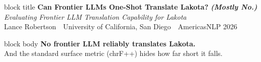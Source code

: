 \documentclass[final]{beamer}
\begin{document}
\begin{frame}[t]

\begin{beamercolorbox}[wd=\paperwidth,sep=22pt]{block title}
\centering
{\headfont\bfseries\fontsize{74}{86}\selectfont Can Frontier LLMs One-Shot Translate Lakota?\,\,{\itshape\color{warmlight}(Mostly No.)}}\\[10pt]
{\headfont\itshape\fontsize{30}{38}\selectfont Evaluating Frontier LLM Translation Capability for Lakota}\\[8pt]
{\headfont\fontsize{26}{32}\selectfont Lance Robertson\, \textperiodcentered\, University of California, San Diego\, \textperiodcentered\, AmericasNLP 2026}
\end{beamercolorbox}

\vspace{12pt}

\begin{beamercolorbox}[wd=\paperwidth,sep=18pt]{block body}
\centering
{\headfont\bfseries\fontsize{62}{74}\selectfont No frontier LLM reliably translates Lakota.}\\[10pt]
{\headfont\fontsize{38}{48}\selectfont And the standard surface metric (chrF++) hides how far short it falls.}
\end{beamercolorbox}

\vspace{14pt}


\end{frame}
\end{document}
